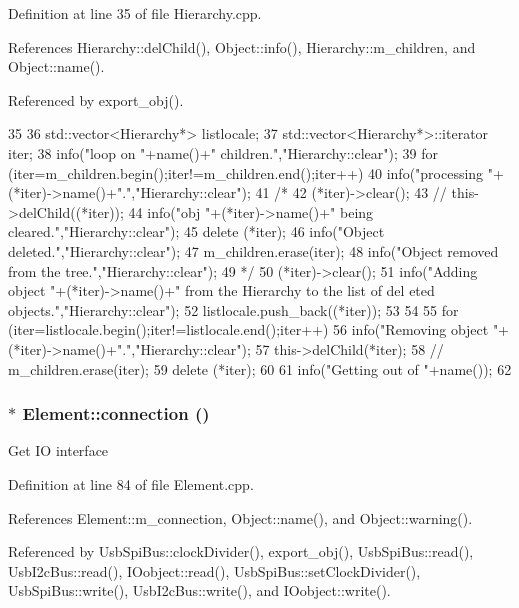 Definition at line 35 of file Hierarchy.cpp.

References Hierarchy::delChild(), Object::info(), Hierarchy::m\_\-children, and Object::name().

Referenced by export\_\-obj().


\begin{DoxyCode}
35                      {
36   std::vector<Hierarchy*> listlocale;
37   std::vector<Hierarchy*>::iterator iter;
38   info("loop on "+name()+" children.","Hierarchy::clear");
39   for (iter=m_children.begin();iter!=m_children.end();iter++){
40       info("processing "+(*iter)->name()+".","Hierarchy::clear");
41 /*
42       (*iter)->clear();
43 //      this->delChild((*iter));
44       info("obj "+(*iter)->name()+" being cleared.","Hierarchy::clear");
45       delete (*iter);
46       info("Object deleted.","Hierarchy::clear");
47       m_children.erase(iter);
48       info("Object removed from the tree.","Hierarchy::clear");
49 */
50     (*iter)->clear();
51     info("Adding object "+(*iter)->name()+" from the Hierarchy to the list of del
      eted objects.","Hierarchy::clear");
52     listlocale.push_back((*iter));
53   }
54 
55   for (iter=listlocale.begin();iter!=listlocale.end();iter++){
56     info("Removing object "+(*iter)->name()+".","Hierarchy::clear");
57     this->delChild(*iter);
58 //    m_children.erase(iter);
59     delete (*iter);
60   }
61   info("Getting out of "+name());
62 }
\end{DoxyCode}
\hypertarget{classElement_af57444353c1ddf9fa0109801e97debf7}{
\subsubsection[{connection}]{ $\ast$ Element::connection ()}}
\label{classElement_af57444353c1ddf9fa0109801e97debf7}
Get IO interface 

Definition at line 84 of file Element.cpp.

References Element::m\_\-connection, Object::name(), and Object::warning().

Referenced by UsbSpiBus::clockDivider(), export\_\-obj(), UsbSpiBus::read(), UsbI2cBus::read(), IOobject::read(), UsbSpiBus::setClockDivider(), UsbSpiBus::write(), UsbI2cBus::write(), and IOobject::write().


